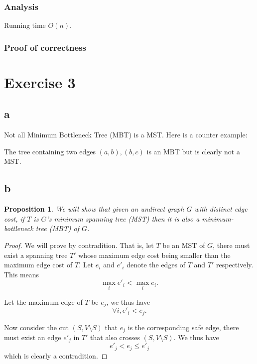 \documentclass[a4paper,10pt,twoside]{article}
\newtheorem{proof}{Proof}
\newtheorem{proposition}{Proposition}
\begin{document}
\subsubsection*{Analysis}
Running time $O(n)$.
\subsubsection*{Proof of correctness}
\section*{Exercise 3}

\subsection*{a}
Not all Minimum Bottleneck Tree (MBT) is a MST. Here is a counter example:

\begin{figure}[h]
	\centering
{}
	\label{fig:figure1}
\end{figure}
The tree containing two edges $(a, b), (b, c)$ is an MBT but is clearly
not a MST.

\subsection*{b}
\begin{proposition}
We will show that given an undirect graph $G$ with distinct edge
cost, if $T$ is $G$'s minimum spanning
tree (MST) then it is also a minimum-bottleneck tree (MBT) of $G$.	
\end{proposition}
\begin{proof}
	We will prove by contradition. That is, let $T$ be an MST of $G$,
	there must exist a spanning tree $T'$ whose maximum edge cost
	being smaller than the maximum edge cost of $T$.
	Let $e_i$ and $e'_i$ denote the edges of $T$ and $T'$ respectively.
	This means
	\[
		\max_i{e'_i} < \max_i{e_i}.
	\]

	Let the maximum edge of $T$ be $e_j$, we thus have
	\[
		\forall i, e'_i < e_j.
	\]

	Now consider the cut $(S, V\setminus S)$ that $e_j$ is the corresponding
	safe edge, there must exist an edge $e'_j$ in $T'$ that also crosses $(S, V\setminus S)$.
	We thus have
	\[
		e'_j < e_j \leq e'_j
	\]
	which is clearly a contradition.
\end{proof}
\end{document}
